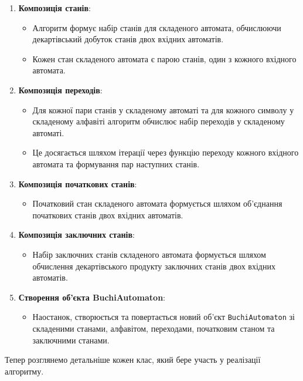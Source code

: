 \documentclass[12pt,a4paper]{article}
\begin{document}
\begin{enumerate}
    \item \textbf{Композиція станів}:
    \begin{itemize}
        \item Алгоритм формує набір станів для складеного автомата, обчислюючи декартівський добуток станів двох вхідних автоматів.
        \item Кожен стан складеного автомата є парою станів, один з кожного вхідного автомата.
    \end{itemize}

    \item \textbf{Композиція переходів}:
    \begin{itemize}
        \item Для кожної пари станів у складеному автоматі та для кожного символу у складеному алфавіті алгоритм обчислює набір переходів у складеному автоматі.
        \item Це досягається шляхом ітерації через функцію переходу кожного вхідного автомата та формування пар наступних станів.
    \end{itemize}

    \item \textbf{Композиція початкових станів}:
    \begin{itemize}
        \item Початковий стан складеного автомата формується шляхом об'єднання початкових станів двох вхідних автоматів.
    \end{itemize}

    \item \textbf{Композиція заключних станів}:
    \begin{itemize}
        \item Набір заключних станів складеного автомата формується шляхом обчислення декартівського продукту заключних станів двох вхідних автоматів.
    \end{itemize}

    \item \textbf{Створення об'єкта BuchiAutomaton}:
    \begin{itemize}
        \item Наостанок, створюється та повертається новий об'єкт \texttt{BuchiAutomaton} зі складеними станами, алфавітом, переходами, початковим станом та заключними станами.
    \end{itemize}
\end{enumerate}

Тепер розглянемо детальніше кожен клас, який бере участь у реалізації алгоритму.
\end{document}
